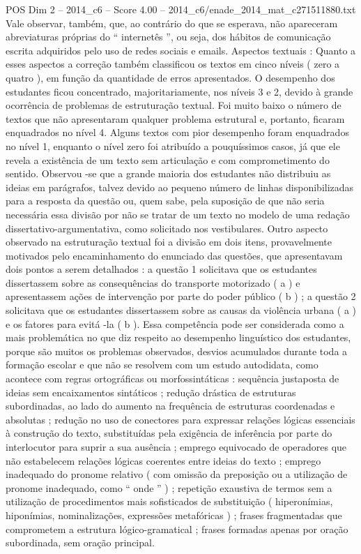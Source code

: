 \begin{textsample}{POS Dim 2 – 2014\_c6 – Score 4.00 – 2014\_c6/enade\_2014\_mat\_c271511880.txt}
Vale observar, também, que, ao contrário do que se esperava, não apareceram abreviaturas próprias do “ internetês ”, ou seja, dos hábitos de comunicação escrita adquiridos pelo uso de redes sociais e emails.
Aspectos textuais : Quanto a esses aspectos a correção também classificou os textos em cinco níveis ( zero a quatro ), em função da quantidade de erros apresentados.
O desempenho dos estudantes ficou concentrado, majoritariamente, nos níveis 3 e 2, devido à grande ocorrência de problemas de estruturação textual.
Foi muito baixo o número de textos que não apresentaram qualquer problema estrutural e, portanto, ficaram enquadrados no nível 4.
Alguns textos com pior desempenho foram enquadrados no nível 1, enquanto o nível zero foi atribuído a pouquíssimos casos, já que ele revela a existência de um texto sem articulação e com comprometimento do sentido.
Observou -se que a grande maioria dos estudantes não distribuiu as ideias em parágrafos, talvez devido ao pequeno número de linhas disponibilizadas para a resposta da questão ou, quem sabe, pela suposição de que não seria necessária essa divisão por não se tratar de um texto no modelo de uma redação dissertativo-argumentativa, como solicitado nos vestibulares.
Outro aspecto observado na estruturação textual foi a divisão em dois itens, provavelmente motivados pelo encaminhamento do enunciado das questões, que apresentavam dois pontos a serem detalhados : a questão 1 solicitava que os estudantes dissertassem sobre as consequências do transporte motorizado ( a ) e apresentassem ações de intervenção por parte do poder público ( b ) ; a questão 2 solicitava que os estudantes dissertassem sobre as causas da violência urbana ( a ) e os fatores para evitá -la ( b ).
Essa competência pode ser considerada como a mais problemática no que diz respeito ao desempenho linguístico dos estudantes, porque são muitos os problemas observados, desvios acumulados durante toda a formação escolar e que não se resolvem com um estudo autodidata, como acontece com regras ortográficas ou morfossintáticas : sequência justaposta de ideias sem encaixamentos sintáticos ; redução drástica de estruturas subordinadas, ao lado do aumento na frequência de estruturas coordenadas e absolutas ; redução no uso de conectores para expressar relações lógicas essenciais à construção do texto, substituídas pela exigência de inferência por parte do interlocutor para suprir a sua ausência ; emprego equivocado de operadores que não estabelecem relações lógicas coerentes entre ideias do texto ; emprego inadequado do pronome relativo ( com omissão da preposição ou a utilização de pronome inadequado, como “ onde ” ) ; repetição exaustiva de termos sem a utilização de procedimentos mais sofisticados de substituição ( hiperonímias, hiponímias, nominalizações, expressões metafóricas ) ; frases fragmentadas que comprometem a estrutura lógico-gramatical ; frases formadas apenas por oração subordinada, sem oração principal.

\end{textsample}
